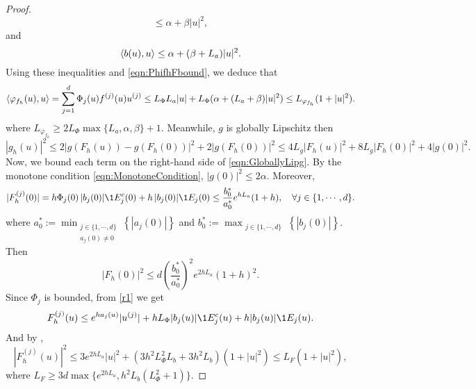 \begin{proof}
\begin{equation*}
	\leq \alpha +\beta |u|^2,
\end{equation*}
and
\begin{equation*}\label{eqn:bDotProdBound}
	\left\langle b(u), u\right\rangle \leq \alpha + (\beta + L_a)|u|^2.
\end{equation*}
Using these inequalities and \eqref{eqn:PhifhFbound}, we deduce that
\begin{equation}\label{eqn:VarphifhDotProdBound}
	\left\langle\varphi_{f_h}(u), u\right\rangle 
		=\sum_{j=1}^d
		\Phi_j(u) f^{(j)}(u) u^{(j)}
		\leq L_{\Phi} L_a|u| +  L_{\Phi}(\alpha + (L_a + \beta)|u|^2) \leq
		L_{\varphi_{f_h}} (1+|u|^2).					
\end{equation}
where
	$
		L_{\varphi_{f_h}}\geq 2 L_{\Phi}\max\{L_a, \alpha, \beta\} + 1.
	$ 
Meanwhile, $g$ is globally Lipschitz then
\begin{equation}\label{eqn:GloballyLipg}
	|g_h(u)|^2 
	\leq
		2 |g(F_h(u)) - g(F_h(0))|^2  + 2 | g(F_h(0))|^2 \leq
		4 L_g |F_h(u)|^2  + 8 L_g |F_h(0)|^2  + 4 |g(0)|^2 .
\end{equation}
Now, we bound each term on the right-hand side of  \eqref{eqn:GloballyLipg}.
By the monotone condition \eqref{eqn:MonotoneCondition}, $|g(0)|^2 \leq 2\alpha$.
Moreover,
\begin{equation*}
	|F_h^{(j)} (0) |=
		h\Phi_j(0)\,| b_j(0)| \1{E_j^c}(0) + 
		h\,|b_j(0)| \1{E_j}(0)
		\leq
		\frac{b_0^*}{a_0^*}
		e^{h L_a} (1+h),
	\quad
	\forall j \in \{1, \cdots, d\}.
\end{equation*}
where
	$a^*_0 := 
	\min_{
		\substack{
			j \in \{1, \cdots, d \}\\
			a_j(0) \neq 0
		}
	}
	\left\{
		|a_j(0)|
	\right\}$
and 
	$b^*_0 :=
		\max_{\substack{
		j\in \{1,\cdots, d\}}
	}
	\left\{
		|b_j(0)|
	\right\}.$
Then
\begin{equation} \label{eqn:BoundFhZero}
	|F_h(0)|^2 
	\leq
		d\left(
			\frac{b_0^*}{a_0^*}
		\right)^2
		e^{2h L_a} (1+h)^2.
\end{equation}
Since $\Phi_j$ is bounded, from \eqref{r1} we get
\begin{dmath*}
	F_h^{(j)}(u) 
	\leq
	e^{h a_j(u)} |u^{(j)}| +
	h L_{\Phi} |b_j(u)| \1{E_j^c}(u) +h |b_j(u)| \1{E_j}(u).
\end{dmath*}
And by ,
\begin{equation}\label{eqn:BoundFhu}
	|F_h^{(j)}(u)|^2 
		\leq 3 e^{2h L_a }|u|^2 + (3 h^2 L_{\Phi}^2 L_b + 3h^ 2L_b) (1+|u|^2) 
		\leq L_F(1+|u|^2), 
\end{equation}
where $L_F\geq 3 d \max\{e^{2h L_a},  h^2 L_b(L_{\Phi}^2+1)\}$.

\end{proof}
